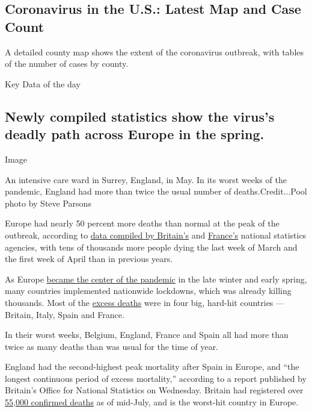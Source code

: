\hypertarget{coronavirus-in-the-us-latest-map-and-case-count}{%
\subsection{Coronavirus in the U.S.: Latest Map and Case
Count}\label{coronavirus-in-the-us-latest-map-and-case-count}}

A detailed county map shows the extent of the coronavirus outbreak, with
tables of the number of cases by county.

Key Data of the day

\hypertarget{newly-compiled-statistics-show-the-viruss-deadly-path-across-europe-in-the-spring}{%
\subsection{Newly compiled statistics show the virus's deadly path
across Europe in the
spring.}\label{newly-compiled-statistics-show-the-viruss-deadly-path-across-europe-in-the-spring}}

Image

An intensive care ward in Surrey, England, in May. In its worst weeks of
the pandemic, England had more than twice the usual number of
deaths.Credit...Pool photo by Steve Parsons

Europe had nearly 50 percent more deaths than normal at the peak of the
outbreak, according to
\href{https://www.ons.gov.uk/peoplepopulationandcommunity/birthsdeathsandmarriages/deaths/articles/comparisonsofallcausemortalitybetweeneuropeancountriesandregions/januarytojune2020}{data
compiled by Britain's} and
\href{https://www.insee.fr/fr/statistiques/4637552}{France's} national
statistics agencies, with tens of thousands more people dying the last
week of March and the first week of April than in previous years.

As Europe
\href{https://www.nytimes.com/2020/03/21/world/europe/italy-coronavirus-center-lessons.html}{became
the center of the pandemic} in the late winter and early spring, many
countries implemented nationwide lockdowns, which was already killing
thousands. Most of the
\href{https://www.nytimes.com/interactive/2020/04/21/world/coronavirus-missing-deaths.html}{excess
deaths} were in four big, hard-hit countries --- Britain, Italy, Spain
and France.

In their worst weeks, Belgium, England, France and Spain all had more
than twice as many deaths than was usual for the time of year.

England had the second-highest peak mortality after Spain in Europe, and
``the longest continuous period of excess mortality,'' according to a
report published by Britain's Office for National Statistics on
Wednesday. Britain had registered over
\href{https://www.ons.gov.uk/peoplepopulationandcommunity/birthsdeathsandmarriages/deaths/datasets/weeklyprovisionalfiguresondeathsregisteredinenglandandwales}{55,000
confirmed deaths} as of mid-July, and is the worst-hit country in
Europe.

